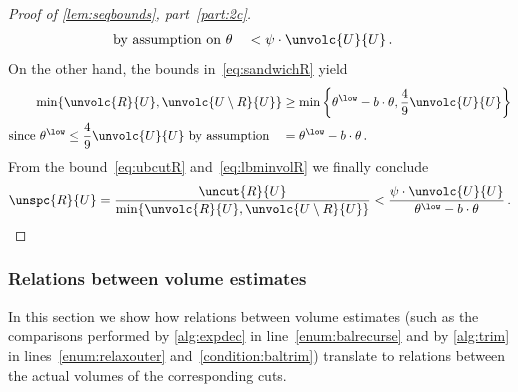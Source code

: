 \begin{proof}[Proof of \cref{lem:seqbounds}, part~\eqref{part:2c}]
\begin{align}
		\text{by assumption on $\theta$}\quad & < \psi \cdot {\unvolc{U}{U}} \, . \label{eq:ubcutR}
	\end{align}
On the other hand, the bounds in~\eqref{eq:sandwichR} yield
\begin{align}
	\min\{\unvolc{R}{U},\unvolc{U \setminus R}{U}\} & \ge 	\min\left\{ \theta^{\low}-b \cdot \theta, \frac{4}{9}\unvolc{U}{U}\right\} \\
	\text{since $\theta^{\low} \le \frac{4}{9} \unvolc{U}{U} $ by assumption} \quad & = \theta^{\low}-b \cdot \theta \, .  \label{eq:lbminvolR}
\end{align}
From the bound~\eqref{eq:ubcutR} and~\eqref{eq:lbminvolR} we finally conclude
\begin{equation*}
	\unspc{R}{U} = \frac{	\uncut{R}{U}}{\min\{\unvolc{R}{U},\unvolc{U \setminus R}{U}\}} < \frac{\psi \cdot {\unvolc{U}{U}}}{\theta^{\low}-b \cdot \theta} \, .
\end{equation*}
\end{proof}

\subsubsection{Relations between volume estimates}
\label{subsubsec:estim}
In this section we show how relations between volume estimates (such as the comparisons performed by \cref{alg:expdec} in line~\eqref{enum:balrecurse} and by \cref{alg:trim} in lines~\eqref{enum:relaxouter} and~\eqref{condition:baltrim}) translate to relations between the actual volumes of the corresponding cuts.

